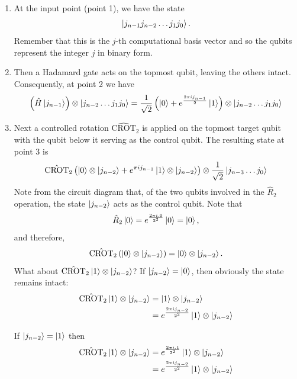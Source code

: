 \documentclass[12pt,oneside]{book}
\begin{document}
\begin{enumerate}
    \item At the input point (point 1), we have the state $$\ket{j_{n-1} j_{n-2}\hdots j_1 j_0}.$$
    Remember that this is the $j$-th computational basis vector and so the qubits represent the integer $j$ in binary form.
    \item Then a Hadamard gate acts on the topmost qubit, leaving the others intact. Consequently, at point 2 we have 
    \begin{align*}
        \left(\hat{H}\ket{j_{n-1}}\right)\otimes\ket{j_{n-2}\hdots j_1 j_0} = \frac{1}{\sqrt{2}}\left(\ket{0}+e^{\frac{2\pi i j_{n-1}}{2}}\ket{1}\right)\otimes \ket{j_{n-2}\hdots j_1 j_0}
    \end{align*}
    \item Next a controlled rotation $\hat{\mathrm{CROT}}_2$ is applied on the topmost target qubit with the qubit below it serving as the control qubit. The resulting state at point 3 is
    \begin{align*}
\hat{\mathrm{CROT}}_2\left(\ket{0}\otimes\ket{j_{n-2}}+e^{\pi i j_{n-1}}\ket{1}\otimes\ket{j_{n-2}}\right)\otimes \frac{1}{\sqrt{2}}\ket{j_{n-3}\hdots j_0}
    \end{align*}
    Note from the circuit diagram that, of the two qubits involved in the $\hat{R}_2$ operation, the state $\ket{j_{n-2}}$ acts as the control qubit. Note that $$\hat{R}_2\ket{0}=e^{\frac{2\pi i.0}{2^2}}\ket{0}=\ket{0},$$
    and therefore, 
    $$\hat{\mathrm{CROT}}_2\left(\ket{0}\otimes\ket{j_{n-2}}\right) = \ket{0}\otimes\ket{j_{n-2}}.$$
    What about $\hat{\mathrm{CROT}}_2 \ket{1}\otimes\ket{j_{n-2}}$?
    If $\ket{j_{n-2}}=\ket{0}$, then obviously the state remains intact:
    \begin{align*}
        \hat{\mathrm{CROT}}_2 \ket{1}\otimes\ket{j_{n-2}} &{}= \ket{1}\otimes\ket{j_{n-2}}\\
        &{} = e^{\frac{2\pi ij_{n-2}}{2^2}}\ket{1}\otimes\ket{j_{n-2}}
    \end{align*}
    
    If $\ket{j_{n-2}}=\ket{1}$ then
    \begin{align*}
        \hat{\mathrm{CROT}}_2 \ket{1}\otimes\ket{j_{n-2}} &{} = e^{\frac{2\pi i.1}{2^2}}\ket{1}\otimes\ket{j_{n-2}}\\
        &{} = e^{\frac{2\pi ij_{n-2}}{2^2}}\ket{1}\otimes\ket{j_{n-2}}
    \end{align*}
    

\end{enumerate}
\end{document}
